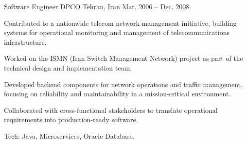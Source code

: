 \begin{cventries}
  \cventry
    {Software Engineer} %
    {DPCO} %
    {Tehran, Iran} %
    {Mar. 2006 -- Dec. 2008} %
    {
      \begin{cvitems} %
        \item {Contributed to a nationwide telecom network management initiative, building systems for operational monitoring and management of telecommunications infrastructure.}
        \item {Worked on the ISMN (Iran Switch Management Network) project as part of the technical design and implementation team.}
        \item {Developed backend components for network operations and traffic management, focusing on reliability and maintainability in a mission-critical environment.}
        \item {Collaborated with cross-functional stakeholders to translate operational requirements into production-ready software.}
        \item {Tech: Java, Microservices, Oracle Database.}
      \end{cvitems}
    }

\end{cventries}
